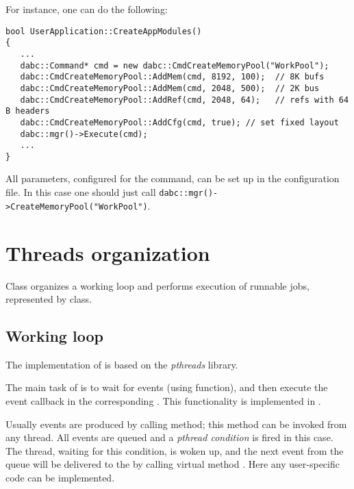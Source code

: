 For instance, one can do the following:

\begin{small}
\begin{verbatim}     
bool UserApplication::CreateAppModules()
{
   ...
   dabc::Command* cmd = new dabc::CmdCreateMemoryPool("WorkPool");
   dabc::CmdCreateMemoryPool::AddMem(cmd, 8192, 100);  // 8K bufs
   dabc::CmdCreateMemoryPool::AddMem(cmd, 2048, 500);  // 2K bus
   dabc::CmdCreateMemoryPool::AddRef(cmd, 2048, 64);   // refs with 64 B headers
   dabc::CmdCreateMemoryPool::AddCfg(cmd, true); // set fixed layout
   dabc::mgr()->Execute(cmd);
   ...
}
\end{verbatim}     
\end{small}

All parameters, configured for the command, can be set up in the configuration file.
In this case one should just call {\tt dabc::mgr()->CreateMemoryPool("WorkPool")}. 


\section{Threads organization}
\label{prog_services_threads}
Class  organizes a working loop and performs execution of
runnable jobs, represented by  class.


\subsection{Working loop}
\label{prog_services_threads_workloop}
The implementation of  is based on the 
{\em pthreads} library.
 
The main task of  is to wait for events (using  function),
and then execute the event callback in the corresponding
. 
This functionality is implemented  in .
 
Usually events are produced by calling  
method; this method can be invoked from any thread. All events are queued and a
{\em pthread condition} is fired in this case. 
The thread, waiting for this condition, is woken up, and the
next event from the queue will be delivered to the  by calling virtual method . 
Here any user-specific code can be implemented.

